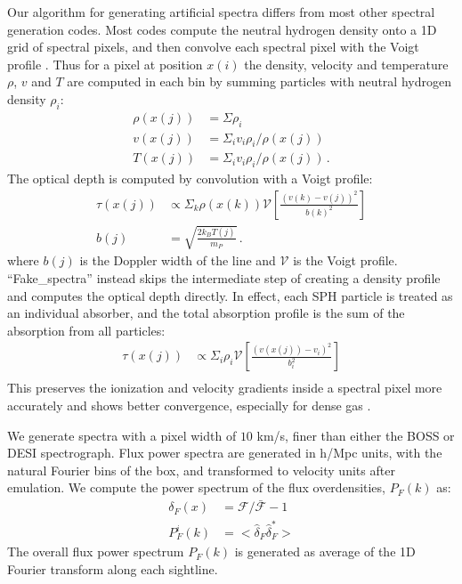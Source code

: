 \documentclass[a4paper,11pt]{article}
\newcommand{\Lya}{Lyman-$\alpha$}
\begin{document}
Our algorithm for generating artificial spectra differs from most other spectral generation codes. Most codes compute the neutral hydrogen density onto a 1D grid of spectral pixels, and then convolve each spectral pixel with the Voigt profile \cite[e.g.~]{Theuns:1998, Chabanier:2022}. Thus for a pixel at position $x(i)$ the density, velocity and temperature $\rho$, $v$ and $T$ are computed in each bin by summing particles with neutral hydrogen density $\rho_i$:
\begin{align}
 \rho(x(j)) &= \Sigma \rho_i \\
 v(x(j)) &= \Sigma_i v_i \rho_i / \rho(x(j)) \\
 T(x(j)) &= \Sigma_i v_i \rho_i / \rho(x(j))\,.
\end{align}
The optical depth is computed by convolution with a Voigt profile:
\begin{align}
 \tau(x(j)) &\propto \Sigma_k \rho(x(k)) \mathcal{V}\left[\frac{(v(k) - v(j))^2}{b(k)^2}\right] \\
 b(j) &= \sqrt{\frac{2 k_B T(j)}{m_P}}\,.
\end{align}
where $b(j)$ is the Doppler width of the line and $\mathcal{V}$ is the Voigt profile.
``Fake\_spectra'' instead skips the intermediate step of creating a density profile and computes the optical depth directly. In effect, each SPH particle is treated as an individual absorber, and the total absorption profile is the sum of the absorption from all particles:
\begin{align}
 \tau(x(j)) &\propto \Sigma_i \rho_i \mathcal{V}\left[\frac{(v(x(j)) - v_i)^2}{b_i^2}\right] \\
\end{align}
This preserves the ionization and velocity gradients inside a spectral pixel more accurately and shows better convergence, especially for dense gas \cite{Bird:2015}.


We generate spectra with a pixel width of $10$ km/s, finer than either the BOSS or DESI spectrograph. Flux power spectra are generated in h/Mpc units, with the natural Fourier bins of the box, and transformed to velocity units after emulation. We compute the power spectrum of the flux overdensities, $P_F(k)$ as:
\begin{align}
 \delta_F(x) &= \mathcal{F} / \bar{\mathcal{F}} - 1 \\
 P_F^i(k) &= < \hat{\delta}_F \hat{\delta}_F^* >
\end{align}
The overall flux power spectrum $P_F(k) $ is generated as average of the 1D Fourier transform along each sightline.
\end{document}
